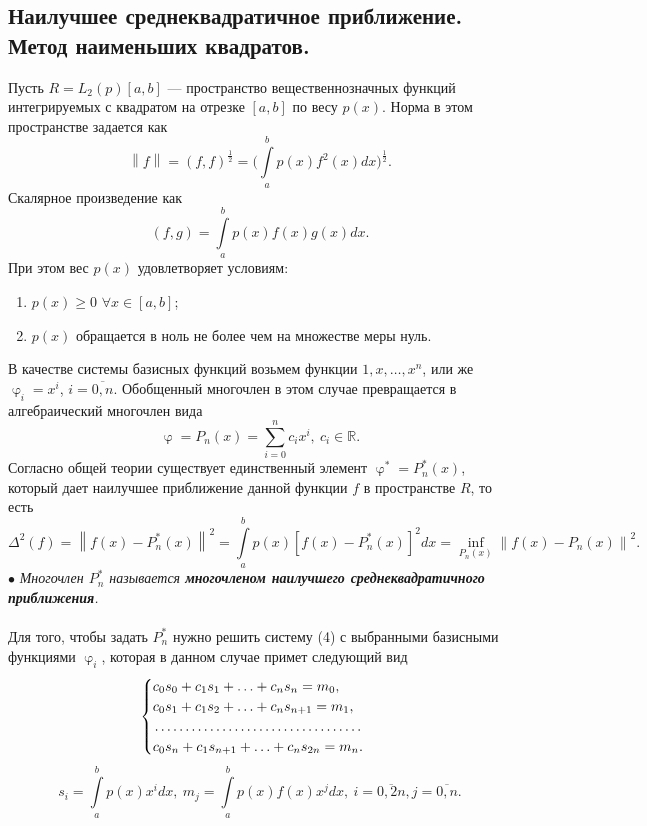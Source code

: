 \documentclass[a4paper, 12pt]{report}
\numberwithin{equation}{section}
\newcommand{\Rm}{\mathbb{R}}
\renewcommand{\geq}{\geqslant}
\renewcommand{\varphi}{\upvarphi}
\newcommand\Norm[1]{\left\| #1 \right\|}
\begin{document}
 \subsection{Наилучшее среднеквадратичное приближение. Метод наименьших квадратов.}
 Пусть $R = L_2(p)[a,b]$ --- пространство вещественнозначных функций интегрируемых с квадратом на отрезке $[a,b]$ по весу $p(x)$. Норма в этом пространстве задается как $$\Norm{f} = (f,f)^{\frac12} = \Big(\int\limits_a^b p(x) f^2(x)dx\Big)^{\frac12}.$$
 Скалярное произведение как 
 \begin{equation}
 	(f,g) = \int\limits_a^b p(x) f(x) g(x)dx.
 \end{equation}
 При этом вес $p(x)$ удовлетворяет условиям:
 \begin{enumerate}
 	\item $p(x) \geq 0$ $\forall x \in [a,b]$;
 	\item $p(x)$ обращается в ноль не более чем на множестве меры нуль.
 \end{enumerate} 
 В качестве системы базисных функций возьмем функции $1, x, \ldots, x^n$, или же $\varphi_i = x^i$, $i=\overline{0,n}$. Обобщенный многочлен в этом случае превращается в алгебраический многочлен вида 
 \begin{equation}
 	\varphi = P_n(x) = \sum_{i=0}^{n}c_ix^i,\ c_i \in\Rm.
 \end{equation}
 Согласно общей теории существует единственный элемент $\varphi^* = P_n^*(x)$, который дает наилучшее приближение данной функции $f$ в пространстве $R$, то есть $$\Delta^2(f) = \Norm{f(x) - P_n^*(x)}^2=\int\limits_a^b p(x)[f(x) - P_n^*(x)]^2dx=\underset{P_n(x)}{\inf}\Norm{f(x) - P_n(x)}^2.$$
 $\bullet$ \textit{Многочлен $P_n^*$ называется \textbf{многочленом наилучшего среднеквадратичного приближения}.}
 \\\\
 Для того, чтобы задать $P_n^*$ нужно решить систему (4) с выбранными базисными функциями $\varphi_i$, которая в данном случае примет следующий вид 
 \begin{equation}
 	\begin{cases}
	 	c_0s_0 + c_1s_1 + \ldots + c_ns_n = m_0,\\
	 	c_0s_1 + c_1s_2 + \ldots + c_ns_{n+1} = m_1,\\
	 	\dotfill\\
	 	c_0s_n + c_1s_{n+1} + \ldots + c_ns_{2n} = m_n.
 	\end{cases}
 \end{equation}
 $$s_i = \int\limits_a^b p(x) x^i dx,\ m_j= \int\limits_a^b p(x) f(x) x^j dx,\ i=\overline{0,2n}, j=\overline{0,n}.$$
\end{document}
